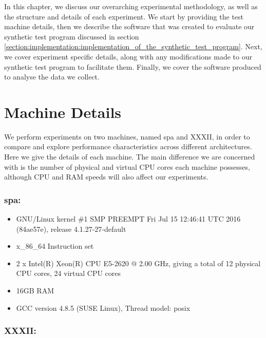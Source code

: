 
In this chapter, we discuss our overarching experimental methodology, as well as the structure and details of each experiment. We start by providing the test machine details, then we describe the software that was created to evaluate our synthetic test program discussed in section \ref{section:implementation:implementation_of_the_synthetic_test_program}. Next, we cover experiment specific details, along with any modifications made to our synthetic test program to facilitate them. Finally, we cover the software produced to analyse the data we collect.



\section{Machine Details}
\label{section:experimental_methodology:machine_details}

We perform experiments on two machines, named spa and XXXII, in order to compare and explore performance characteristics across different architectures. Here we give the details of each machine. The main difference we are concerned with is the number of physical and virtual CPU cores each machine possesses, although CPU and RAM speeds will also affect our experiments.



\subsubsection{spa:}

\begin{itemize}
    \item GNU/Linux kernel \#1 SMP PREEMPT Fri Jul 15 12:46:41 UTC 2016 (84ae57e), release 4.1.27-27-default
    \item x\_86\_64 Instruction set
    \item 2 x Intel(R) Xeon(R) CPU E5-2620 @ 2.00 GHz, giving a total of 12 physical CPU cores, 24 virtual CPU cores
    \item 16GB RAM
    \item GCC version 4.8.5 (SUSE Linux), Thread model: posix
\end{itemize}



\subsubsection{XXXII:}

